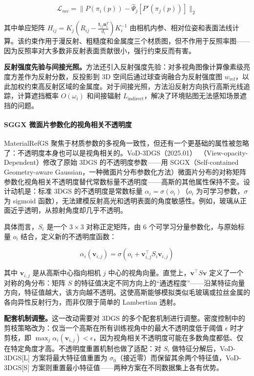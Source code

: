 \begin{equation}
\mathcal{L}_{mv} = \|P(\pi_i(p)) - \hat{\Psi}_j[P'(\pi_j(p))]\|_2
\end{equation}

其中单应矩阵 $H_{ij} = K_j(R_{ij} - \frac{\mathbf{t}_{ij}\mathbf{n}_i^T}{d_i})K_i^{-1}$ 由相机内参、相对位姿和表面法线计算。该约束作用于漫反射、粗糙度和金属度三个材质图，但不作用于反照率图——因为反照率对大多数非反射表面贡献很小，强行约束反而有害。

\textbf{反射强度先验与间接光照。}方法还引入反射强度先验：对多视角图像计算像素级亮度方差作为反射分数，反投影到 3D 空间后通过球查询融合为反射强度图 $w_{\text{ref}}$，以此加权约束高反射区域的金属度。对于间接光照，方法沿反射方向执行高斯光线追踪，计算遮挡概率 $O(\omega_i)$ 和间接辐射 $L_{\text{indirect}}$，解决了环境贴图无法感知场景遮挡的问题。

\paragraph{SGGX 微面片参数化的视角相关不透明度}

MaterialRefGS 聚焦于材质参数的多视角一致性，但还有一个更基础的属性被忽略了：不透明度本身也可以是视角相关的。VoD-3DGS（2025.01）~\cite{2501_17978}（View-opacity-Dependent）修改了原始 3DGS 的不透明度参数——用 SGGX（Self-contained Geometry-aware Gaussian，一种微面片分布参数化方法）微面片分布的对称矩阵参数化视角相关不透明度替代常数标量不透明度——高斯的其他属性保持不变。设计动机是：标准 3DGS 的不透明度是常数标量 $\alpha_i = \sigma(o_i)$（$o_i$ 为可学习参数，$\sigma$ 为 sigmoid 函数），无法建模反射高光和透明表面的角度敏感性。例如，玻璃从正面近乎透明，从掠射角度却几乎不透明。

具体而言，$S_i$ 是一个 $3 \times 3$ 对称正定矩阵，由 6 个可学习分量参数化，与原始标量 $o_i$ 结合，定义新的不透明度函数：

\begin{equation}
\alpha_i(\mathbf{v}_{i,j}) = \sigma(o_i + \mathbf{v}_{i,j}^\top S_i \mathbf{v}_{i,j})
\end{equation}

其中 $\mathbf{v}_{i,j}$ 是从高斯中心指向相机 $j$ 中心的视角向量。直觉上，$\mathbf{v}^\top S \mathbf{v}$ 定义了一个对称的角分布：矩阵 $S$ 的特征值决定不同方向上的``通透程度''——沿某特征向量方向，特征值越大，该方向越不透明。这使高斯能够模拟类似毛玻璃或拉丝金属的各向异性反射行为，而非仅限于简单的 Lambertian 透射。

\textbf{配套机制调整。}这一改动需要对 3DGS 的多个配套机制进行调整。密度控制中的剪枝策略改为：仅当一个高斯在所有训练视角中的最大不透明度低于阈值 $\epsilon$ 时才剪枝，即 $\max_j \alpha_i(\mathbf{v}_{i,j}) < \epsilon$，因为视角相关不透明度可能在多数角度都低、仅在特定角度才高。不透明度重置机制也做了适配：对 $S_i$ 做特征分解后，VoD-3DGS[L] 方案将最大特征值重置为 $\sigma_0$（接近零）而保留其余两个特征值，VoD-3DGS[S] 方案则重置最小特征值——两种方案在不同数据集上各有优势。

